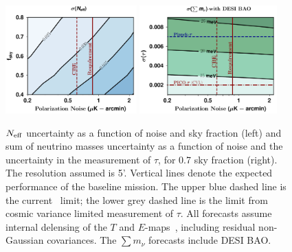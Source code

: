 \documentclass[PICOReport.tex]{subfiles}
\begin{document}
\begin{figure}[t!]
\begin{center}
\includegraphics[width=0.45\textwidth]{images/Neff_final.pdf}
\includegraphics[width=0.47\textwidth]{images/Mnu_tauprior_final.pdf}
\vspace{-0.15in}
\caption{ \small \setlength{\baselineskip}{0.95\baselineskip}
${N_{\rm eff}}$ uncertainty as a function of noise and sky fraction (left) and sum of 
neutrino masses uncertainty as a function of noise and the uncertainty in the measurement of $\tau$, 
for 0.7 sky fraction (right). The resolution assumed is 5'.  
Vertical lines denote the expected performance of the baseline mission. 
The upper blue dashed line is the current \planck~limit; the lower grey dashed line is the limit from cosmic variance 
limited measurement of $\tau$. All forecasts assume internal delensing of the $T$ and $E$-maps~\cite{Green:2016cjr}, 
including residual non-Gaussian covariances.  The $\sum m_\nu$ forecasts include DESI BAO.  
\label{fig:Neff_future} }
\end{center}
\vspace{-0.15in}
\end{figure}
\end{document}
